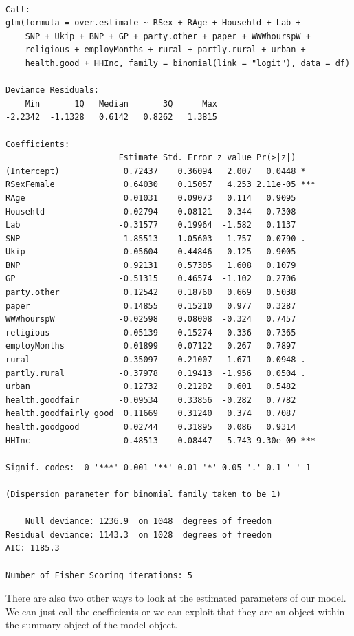 \documentclass[]{article}
\begin{document}
\begin{verbatim}

Call:
glm(formula = over.estimate ~ RSex + RAge + Househld + Lab + 
    SNP + Ukip + BNP + GP + party.other + paper + WWWhourspW + 
    religious + employMonths + rural + partly.rural + urban + 
    health.good + HHInc, family = binomial(link = "logit"), data = df)

Deviance Residuals: 
    Min       1Q   Median       3Q      Max  
-2.2342  -1.1328   0.6142   0.8262   1.3815  

Coefficients:
                       Estimate Std. Error z value Pr(>|z|)    
(Intercept)             0.72437    0.36094   2.007   0.0448 *  
RSexFemale              0.64030    0.15057   4.253 2.11e-05 ***
RAge                    0.01031    0.09073   0.114   0.9095    
Househld                0.02794    0.08121   0.344   0.7308    
Lab                    -0.31577    0.19964  -1.582   0.1137    
SNP                     1.85513    1.05603   1.757   0.0790 .  
Ukip                    0.05604    0.44846   0.125   0.9005    
BNP                     0.92131    0.57305   1.608   0.1079    
GP                     -0.51315    0.46574  -1.102   0.2706    
party.other             0.12542    0.18760   0.669   0.5038    
paper                   0.14855    0.15210   0.977   0.3287    
WWWhourspW             -0.02598    0.08008  -0.324   0.7457    
religious               0.05139    0.15274   0.336   0.7365    
employMonths            0.01899    0.07122   0.267   0.7897    
rural                  -0.35097    0.21007  -1.671   0.0948 .  
partly.rural           -0.37978    0.19413  -1.956   0.0504 .  
urban                   0.12732    0.21202   0.601   0.5482    
health.goodfair        -0.09534    0.33856  -0.282   0.7782    
health.goodfairly good  0.11669    0.31240   0.374   0.7087    
health.goodgood         0.02744    0.31895   0.086   0.9314    
HHInc                  -0.48513    0.08447  -5.743 9.30e-09 ***
---
Signif. codes:  0 '***' 0.001 '**' 0.01 '*' 0.05 '.' 0.1 ' ' 1

(Dispersion parameter for binomial family taken to be 1)

    Null deviance: 1236.9  on 1048  degrees of freedom
Residual deviance: 1143.3  on 1028  degrees of freedom
AIC: 1185.3

Number of Fisher Scoring iterations: 5
\end{verbatim}

There are also two other ways to look at the estimated parameters of our model. We can just call the coefficients or we can exploit that they are an object within the summary object of the model object.
\end{document}
